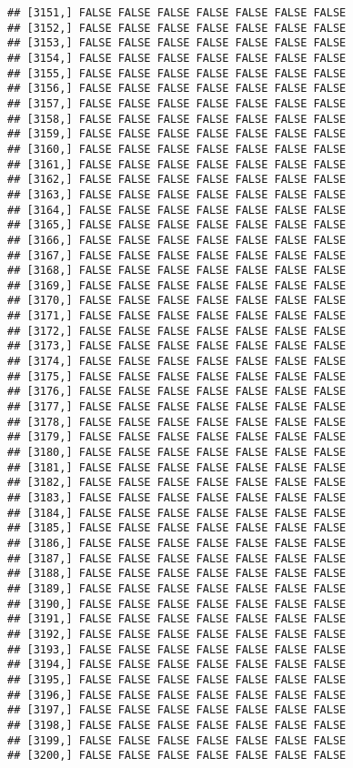 \documentclass[
]{article}
\begin{document}
\begin{verbatim}
## [3151,] FALSE FALSE FALSE FALSE FALSE FALSE FALSE
## [3152,] FALSE FALSE FALSE FALSE FALSE FALSE FALSE
## [3153,] FALSE FALSE FALSE FALSE FALSE FALSE FALSE
## [3154,] FALSE FALSE FALSE FALSE FALSE FALSE FALSE
## [3155,] FALSE FALSE FALSE FALSE FALSE FALSE FALSE
## [3156,] FALSE FALSE FALSE FALSE FALSE FALSE FALSE
## [3157,] FALSE FALSE FALSE FALSE FALSE FALSE FALSE
## [3158,] FALSE FALSE FALSE FALSE FALSE FALSE FALSE
## [3159,] FALSE FALSE FALSE FALSE FALSE FALSE FALSE
## [3160,] FALSE FALSE FALSE FALSE FALSE FALSE FALSE
## [3161,] FALSE FALSE FALSE FALSE FALSE FALSE FALSE
## [3162,] FALSE FALSE FALSE FALSE FALSE FALSE FALSE
## [3163,] FALSE FALSE FALSE FALSE FALSE FALSE FALSE
## [3164,] FALSE FALSE FALSE FALSE FALSE FALSE FALSE
## [3165,] FALSE FALSE FALSE FALSE FALSE FALSE FALSE
## [3166,] FALSE FALSE FALSE FALSE FALSE FALSE FALSE
## [3167,] FALSE FALSE FALSE FALSE FALSE FALSE FALSE
## [3168,] FALSE FALSE FALSE FALSE FALSE FALSE FALSE
## [3169,] FALSE FALSE FALSE FALSE FALSE FALSE FALSE
## [3170,] FALSE FALSE FALSE FALSE FALSE FALSE FALSE
## [3171,] FALSE FALSE FALSE FALSE FALSE FALSE FALSE
## [3172,] FALSE FALSE FALSE FALSE FALSE FALSE FALSE
## [3173,] FALSE FALSE FALSE FALSE FALSE FALSE FALSE
## [3174,] FALSE FALSE FALSE FALSE FALSE FALSE FALSE
## [3175,] FALSE FALSE FALSE FALSE FALSE FALSE FALSE
## [3176,] FALSE FALSE FALSE FALSE FALSE FALSE FALSE
## [3177,] FALSE FALSE FALSE FALSE FALSE FALSE FALSE
## [3178,] FALSE FALSE FALSE FALSE FALSE FALSE FALSE
## [3179,] FALSE FALSE FALSE FALSE FALSE FALSE FALSE
## [3180,] FALSE FALSE FALSE FALSE FALSE FALSE FALSE
## [3181,] FALSE FALSE FALSE FALSE FALSE FALSE FALSE
## [3182,] FALSE FALSE FALSE FALSE FALSE FALSE FALSE
## [3183,] FALSE FALSE FALSE FALSE FALSE FALSE FALSE
## [3184,] FALSE FALSE FALSE FALSE FALSE FALSE FALSE
## [3185,] FALSE FALSE FALSE FALSE FALSE FALSE FALSE
## [3186,] FALSE FALSE FALSE FALSE FALSE FALSE FALSE
## [3187,] FALSE FALSE FALSE FALSE FALSE FALSE FALSE
## [3188,] FALSE FALSE FALSE FALSE FALSE FALSE FALSE
## [3189,] FALSE FALSE FALSE FALSE FALSE FALSE FALSE
## [3190,] FALSE FALSE FALSE FALSE FALSE FALSE FALSE
## [3191,] FALSE FALSE FALSE FALSE FALSE FALSE FALSE
## [3192,] FALSE FALSE FALSE FALSE FALSE FALSE FALSE
## [3193,] FALSE FALSE FALSE FALSE FALSE FALSE FALSE
## [3194,] FALSE FALSE FALSE FALSE FALSE FALSE FALSE
## [3195,] FALSE FALSE FALSE FALSE FALSE FALSE FALSE
## [3196,] FALSE FALSE FALSE FALSE FALSE FALSE FALSE
## [3197,] FALSE FALSE FALSE FALSE FALSE FALSE FALSE
## [3198,] FALSE FALSE FALSE FALSE FALSE FALSE FALSE
## [3199,] FALSE FALSE FALSE FALSE FALSE FALSE FALSE
## [3200,] FALSE FALSE FALSE FALSE FALSE FALSE FALSE

\end{verbatim}
\end{document}
